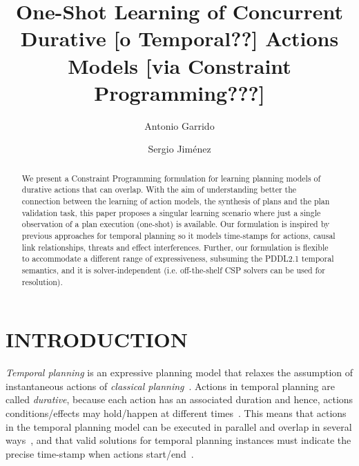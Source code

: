 \documentclass{ecai}
\begin{document}
\title{One-Shot Learning of Concurrent Durative [o Temporal??] Actions Models [via Constraint Programming???]}
\author{Antonio Garrido \and Sergio Jim\'enez}
 
 
\maketitle

\begin{abstract}
  We present a Constraint Programming formulation for learning planning models of durative actions that can 
  overlap. With the aim of understanding better the connection between the learning of action models, the synthesis of plans and the plan validation task, this paper proposes a singular learning scenario where just a single observation of a plan execution (one-shot) is available. Our formulation is inspired by previous approaches for temporal planning so it models time-stamps for actions, causal link relationships, threats and effect interferences. Further, our formulation is flexible to accommodate a different range of expressiveness, subsuming the PDDL2.1 temporal semantics, and it is solver-independent (i.e. off-the-shelf CSP solvers can be used for resolution).   
\end{abstract}


\section{INTRODUCTION}

{\em Temporal planning} is an expressive planning model that relaxes the assumption of instantaneous actions of {\em classical planning}~\cite{geffner2013concise}. Actions in temporal planning are called {\em durative}, because each action has an associated duration and hence, actions conditions/effects may hold/happen at different times~\cite{fox2003pddl2}. This means that actions in the temporal planning model can be executed in parallel and overlap in several ways~\cite{cushing2007temporal}, and that valid solutions for temporal planning instances must indicate the precise time-stamp when actions start/end~\cite{howey2004val}.
\end{document}
